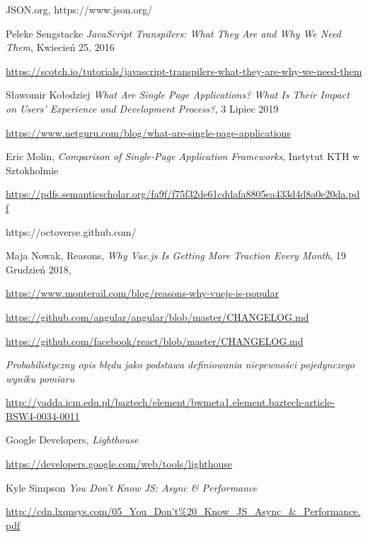 \cleardoublepage
{}
{}


\begin{thebibliography}{99}

   JSON.org, https://www.json.org/
  
  Peleke Sengstacke
 \emph{JavaScript Transpilers: What They Are and Why We Need Them},
  Kwiecień 25, 2016

\url{https://scotch.io/tutorials/javascript-transpilers-what-they-are-why-we-need-them}

Sławomir Kołodziej
\emph{What Are Single Page Applications? What Is Their Impact on Users’ Experience and Development Process?},
3 Lipiec 2019

\url{https://www.netguru.com/blog/what-are-single-page-applications}

Eric Molin, 
\emph{Comparison of Single-Page Application Frameworks},
Instytut KTH w  Sztokholmie

\url{https://pdfs.semanticscholar.org/fa9f/f75f32de61cddafa8805ea433d4d8a0e20da.pdf}

https://octoverse.github.com/

Maja Nowak, Reasons,
\emph{Why Vue.js Is Getting More Traction Every Month},
19 Grudzień 2018, 

\url{https://www.monterail.com/blog/reasons-why-vuejs-is-popular}


\url{https://github.com/angular/angular/blob/master/CHANGELOG.md}

 
\url{https://github.com/facebook/react/blob/master/CHANGELOG.md}

\emph{Probabilistyczny opis błędu jako podstawa definiowania niepewności pojedynczego wyniku pomiaru}

\url{http://yadda.icm.edu.pl/baztech/element/bwmeta1.element.baztech-article-BSW4-0034-0011}

Google Developers,
\emph{Lighthouse}

\url{https://developers.google.com/web/tools/lighthouse}

Kyle Simpson
\emph{You Don't Know JS: Async \& Performance}

\url{http://cdn.lxqnsys.com/05_You_Don't\%20_Know_JS_Async_\&_Performance.pdf}


\end{thebibliography}

